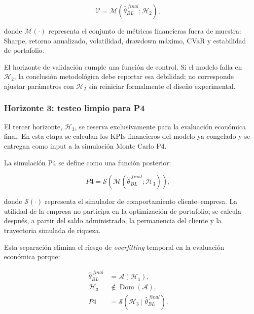 \documentclass[11pt]{article}
\begin{document}
\begin{equation}
    \mathcal{V}
    =
    \mathcal{M}
    \left(
    \widehat{\theta}_{BL}^{\,final};
    \mathcal{H}_2
    \right),
\end{equation}

donde $\mathcal{M}(\cdot)$ representa el conjunto de m\'etricas financieras fuera de muestra: Sharpe, retorno anualizado, volatilidad, drawdown m\'aximo, CVaR y estabilidad de portafolio.

El horizonte de validaci\'on cumple una funci\'on de control. Si el modelo falla en $\mathcal{H}_2$, la conclusi\'on metodol\'ogica debe reportar esa debilidad; no corresponde ajustar par\'ametros con $\mathcal{H}_2$ sin reiniciar formalmente el dise\~no experimental.

\subsubsection{Horizonte 3: testeo limpio para P4}

El tercer horizonte, $\mathcal{H}_3$, se reserva exclusivamente para la evaluaci\'on econ\'omica final. En esta etapa se calculan los KPIs financieros del modelo ya congelado y se entregan como input a la simulaci\'on Monte Carlo P4.

La simulaci\'on P4 se define como una funci\'on posterior:

\begin{equation}
    P4
    =
    \mathcal{S}
    \left(
    \mathcal{M}
    \left(
    \widehat{\theta}_{BL}^{\,final};
    \mathcal{H}_3
    \right)
    \right),
\end{equation}

donde $\mathcal{S}(\cdot)$ representa el simulador de comportamiento cliente--empresa. La utilidad de la empresa no participa en la optimizaci\'on de portafolio; se calcula despu\'es, a partir del saldo administrado, la permanencia del cliente y la trayectoria simulada de riqueza.

Esta separaci\'on elimina el riesgo de \textit{overfitting} temporal en la evaluaci\'on econ\'omica porque:

\begin{align}
    \widehat{\theta}_{BL}^{\,final}
    &=
    \mathcal{A}(\mathcal{H}_1), \\
    \mathcal{H}_3
    &\notin
    \operatorname{Dom}(\mathcal{A}), \\
    P4
    &=
    \mathcal{S}
    \left(
    \mathcal{H}_3
    \mid
    \widehat{\theta}_{BL}^{\,final}
    \right).
\end{align}
\end{document}
